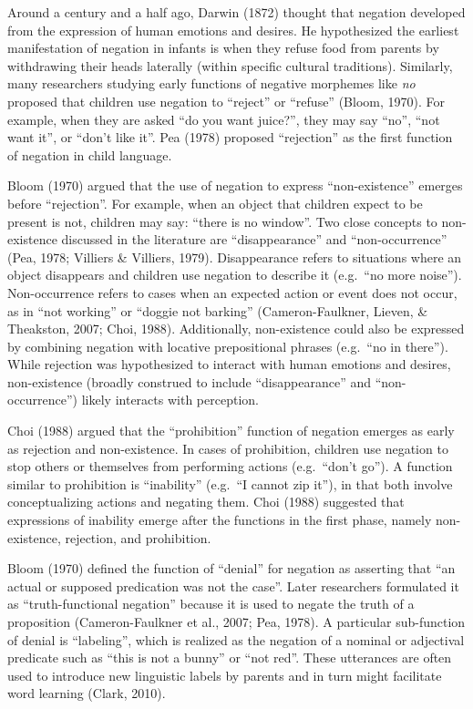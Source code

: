 \documentclass[10pt, letterpaper]{article}
\begin{document}
Around a century and a half ago, Darwin (1872) thought that negation
developed from the expression of human emotions and desires. He
hypothesized the earliest manifestation of negation in infants is when
they refuse food from parents by withdrawing their heads laterally
(within specific cultural traditions). Similarly, many researchers
studying early functions of negative morphemes like \emph{no} proposed
that children use negation to ``reject'' or ``refuse'' (Bloom, 1970).
For example, when they are asked ``do you want juice?'', they may say
``no'', ``not want it'', or ``don't like it''. Pea (1978) proposed
``rejection'' as the first function of negation in child language.

Bloom (1970) argued that the use of negation to express
``non-existence'' emerges before ``rejection''. For example, when an
object that children expect to be present is not, children may say:
``there is no window''. Two close concepts to non-existence discussed in
the literature are ``disappearance'' and ``non-occurrence'' (Pea, 1978;
Villiers \& Villiers, 1979). Disappearance refers to situations where an
object disappears and children use negation to describe it (e.g.~``no
more noise''). Non-occurrence refers to cases when an expected action or
event does not occur, as in ``not working'' or ``doggie not barking''
(Cameron-Faulkner, Lieven, \& Theakston, 2007; Choi, 1988).
Additionally, non-existence could also be expressed by combining
negation with locative prepositional phrases (e.g.~``no in there'').
While rejection was hypothesized to interact with human emotions and
desires, non-existence (broadly construed to include ``disappearance''
and ``non-occurrence'') likely interacts with perception.

Choi (1988) argued that the ``prohibition'' function of negation emerges
as early as rejection and non-existence. In cases of prohibition,
children use negation to stop others or themselves from performing
actions (e.g.~``don't go''). A function similar to prohibition is
``inability'' (e.g.~``I cannot zip it''), in that both involve
conceptualizing actions and negating them. Choi (1988) suggested that
expressions of inability emerge after the functions in the first phase,
namely non-existence, rejection, and prohibition.

Bloom (1970) defined the function of ``denial'' for negation as
asserting that ``an actual or supposed predication was not the case''.
Later researchers formulated it as ``truth-functional negation'' because
it is used to negate the truth of a proposition (Cameron-Faulkner et
al., 2007; Pea, 1978). A particular sub-function of denial is
``labeling'', which is realized as the negation of a nominal or
adjectival predicate such as ``this is not a bunny'' or ``not red''.
These utterances are often used to introduce new linguistic labels by
parents and in turn might facilitate word learning (Clark, 2010).
\end{document}
